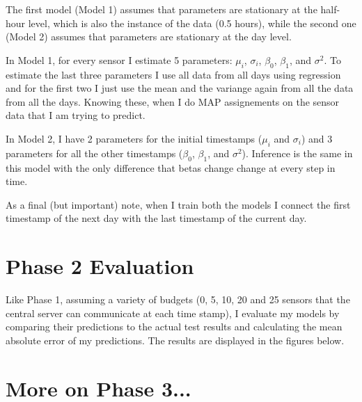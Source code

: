 \documentclass{article}
\begin{document}
The first model (Model 1) assumes that parameters
are stationary at the half-hour level, which is
also the instance of the data (0.5 hours),
while the second one (Model 2) assumes that
parameters are stationary at the day level.

In Model 1, for every sensor I estimate 5 parameters:
$\mu_i$, $\sigma_i$, $\beta_0$, $\beta_1$, and $\sigma^2$.
To estimate the last three parameters I use all data
from all days using regression and for the first two
I just use the mean and the variange again from all
the data from all the days. Knowing these, when I do
MAP assignements on the sensor data that I am trying
to predict.

In Model 2, I have 2 parameters for the initial
timestamps ($\mu_i$ and $\sigma_i$) and 3 parameters
for all the other timestamps ($\beta_0$, $\beta_1$,
and $\sigma^2$). Inference is the same in this model
with the only difference that betas change change at
every step in time.

As a final (but important) note, when I train both
the models I connect the first timestamp of the next
day with the last timestamp of the current day.

\section{Phase 2 Evaluation}

Like Phase 1,
assuming a variety of budgets (0, 5, 10, 20 and 25
sensors that the central server can communicate at
each time stamp), I evaluate my models by comparing
their predictions to the actual test results and
calculating the mean absolute error of my
predictions. The results are displayed in the figures
below.

\section{More on Phase 3...}
\end{document}
